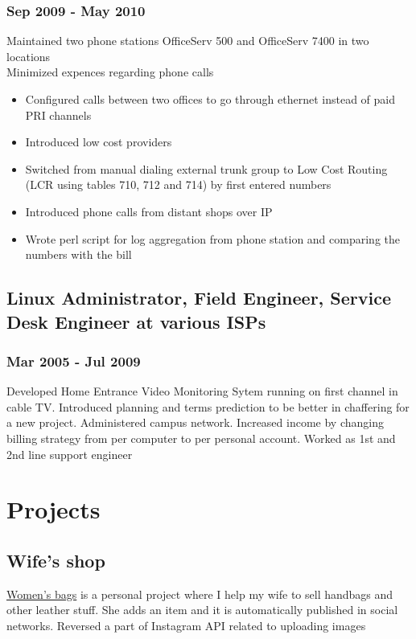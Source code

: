 \documentclass[letterpaper]{article}
\begin{document}
\subsubsection{Sep 2009 - May 2010}
\label{sec-2-5-1}
Maintained two phone stations OfficeServ 500 and OfficeServ 7400 in two locations\\
Minimized expences regarding phone calls
\begin{itemize}
\item Configured calls between two offices to go through ethernet instead of paid PRI channels
\item Introduced low cost providers
\item Switched from manual dialing external trunk group to Low Cost Routing (LCR using tables 710, 712 and 714) by first entered numbers
\item Introduced phone calls from distant shops over IP
\item Wrote perl script for log aggregation from phone station and comparing the numbers with the bill
\end{itemize}
\subsection{Linux Administrator, Field Engineer, Service Desk Engineer at various ISPs}
\label{sec-2-6}
\subsubsection{Mar 2005 - Jul 2009}
\label{sec-2-6-1}
Developed Home Entrance Video Monitoring Sytem running on first channel in cable TV.
Introduced planning and terms prediction to be better in chaffering for a new project. Administered campus network. Increased income by changing billing strategy from per computer to per personal account.
Worked as 1st and 2nd line support engineer

\section{Projects}
\label{sec-3}

\subsection{Wife's shop}
\label{sec-3-1}
\href{https://bars.kh.ua}{Women's bags} is a personal project where I help my wife to sell handbags and other leather stuff. She adds an item and it is automatically published in social networks. Reversed a part of Instagram API related to uploading images
\end{document}
